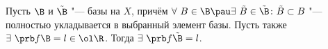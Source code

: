 
 Пусть $\B$ и $\tilde\B$ "--- базы на $X$, причём $\forall\  B\in\B\pau \exists\  \tilde B\in\tilde\B\colon \tilde B\subset B$ "--- полностью укладывается
 в выбранный элемент базы. Пусть также $\exists\  \prb f\B=l\in\ol\R$. Тогда $\exists\ \prb f{\tilde\B}=l$.   
 
